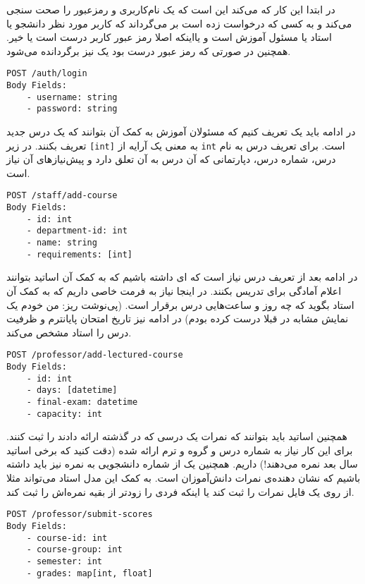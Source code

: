 در ابتدا این
کار که می‌کند این است که یک نام‌کاربری و رمزعبور را صحت سنجی می‌کند و به کسی که درخواست زده است
بر می‌گرداند که کاربر مورد نظر دانشجو یا استاد یا مسئول آموزش است و یااینکه اصلا رمز عبور
کاربر درست است یا خیر. همچنین در صورتی که رمز عبور درست بود یک
نیز برگردانده می‌شود.
\begin{latin}
\begin{lstlisting}
POST /auth/login
Body Fields:
    - username: string
    - password: string
\end{lstlisting}
\end{latin}
در ادامه باید یک
تعریف کنیم که مسئولان آموزش به کمک آن بتوانند که یک درس جدید تعریف بکنند. در
زیر
\verb|[int]|
به معنی یک آرایه از
\verb|int|
است. برای تعریف درس به نام درس، شماره درس، دپارتمانی که آن درس به آن تعلق دارد و پیش‌نیاز‌های آن نیاز است.
\begin{latin}
\begin{lstlisting}
POST /staff/add-course
Body Fields:
    - id: int
    - department-id: int
    - name: string
    - requirements: [int]
\end{lstlisting}
\end{latin}
در ادامه بعد از تعریف درس نیاز است که
ای
داشته باشیم که به کمک آن اساتید بتوانند اعلام آمادگی برای تدریس بکنند. در اینجا نیاز به فرمت خاصی داریم
که به کمک آن استاد بگوید که چه روز و ساعت‌هایی درس برقرار است.
(پی‌نوشت ریز: من خودم یک نمایش مشابه در  قبلا درست کرده بودم)
در ادامه نیز تاریخ امتحان پایانترم و ظرفیت درس را استاد مشخص می‌کند.
\begin{latin}
\begin{lstlisting}
POST /professor/add-lectured-course
Body Fields:
    - id: int
    - days: [datetime]
    - final-exam: datetime
    - capacity: int
\end{lstlisting}
\end{latin}
همچنین اساتید باید بتوانند که نمرات یک درسی که در گذشته ارائه دادند را ثبت کنند.
برای این کار نیاز به شماره درس و گروه و ترم ارائه شده (دقت کنید که برخی اساتید سال بعد نمره می‌دهند!)
داریم. همچنین یک
از شماره دانشجویی به نمره نیز باید داشته باشیم که نشان دهنده‌ی نمرات دانش‌آموزان است.
به کمک این مدل استاد می‌تواند مثلا از روی یک فایل
نمرات را ثبت کند یا اینکه فردی را زودتر از بقیه نمره‌اش را ثبت کند.
\begin{latin}
\begin{lstlisting}
POST /professor/submit-scores
Body Fields:
    - course-id: int
    - course-group: int
    - semester: int
    - grades: map[int, float]
\end{lstlisting}
\end{latin}
